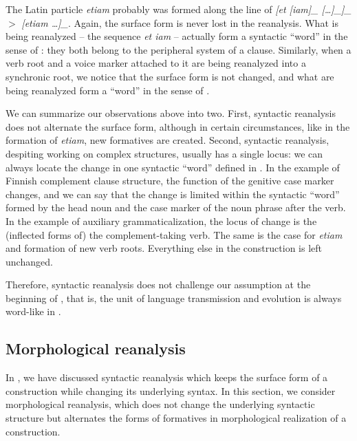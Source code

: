 \documentclass[a4paper, oneside, scheme=plain, 12pt]{article}
\newcommand{\form}[1]{\emph{#1}}
\newcommand*{\textgt}{$>$ }
\begin{document}
The Latin particle \form{etiam} probably was formed along the line of 
\form{[et [iam]_{} [\dots]_{}]_{\text{coordinate clause}}} 
\textgt \form{[etiam \dots]_{}}.
Again, the surface form is never lost in the reanalysis.
What is being reanalyzed -- the sequence \form{et iam} -- 
actually form a syntactic ``word'' in the sense of :
they both belong to the peripheral system of a clause.
Similarly, when a verb root and a voice marker attached to it are being
reanalyzed into a synchronic root,
we notice that the surface form is not changed,
and what are being reanalyzed form a ``word'' in the sense of .

We can summarize our observations above into two.
First, syntactic reanalysis does not alternate the surface form,
although in certain circumstances, like in the formation of \form{etiam},
new formatives are created.
Second, syntactic reanalysis, despiting working on complex structures,
usually has a single locus:
we can always locate the change in one syntactic ``word'' defined in .
In the example of Finnish complement clause structure,
the function of the genitive case marker changes,
and we can say that the change is limited within the syntactic ``word'' formed by the 
head noun and the case marker of the noun phrase after the verb.
In the example of auxiliary grammaticalization,
the locus of change is the (inflected forms of) the complement-taking verb.
The same is the case for \form{etiam} and formation of new verb roots.
Everything else in the construction is left unchanged.

Therefore, syntactic reanalysis does not challenge our assumption at the beginning of ,
that is, the unit of language transmission and evolution is always word-like in .

\subsection{Morphological reanalysis}\label{sec:reanalysis-form-change}

In ,
we have discussed syntactic reanalysis which keeps the surface form of a construction
while changing its underlying syntax.
In this section, we consider morphological reanalysis,
which does not change the underlying syntactic structure
but alternates the forms of formatives in morphological realization of a construction.
\end{document}
